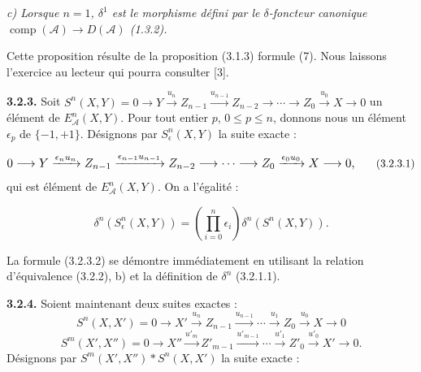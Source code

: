 \clearpage
{}%
\begingroup\small\setlength{\parskip}{0pt}\setlength{\emergencystretch}{1.5em}
\setlength{\abovedisplayskip}{4pt plus 2pt minus 2pt}%
\setlength{\belowdisplayskip}{4pt plus 2pt minus 2pt}%

\noindent\textit{c) Lorsque $n=1$, $\delta^1$ est le morphisme défini par
le $\delta$-foncteur canonique
$\operatorname{comp}(\mathcal A)\longrightarrow D(\mathcal A)$ (1.3.2).}

Cette proposition résulte de la proposition (3.1.3) formule (7). Nous
laissons l'exercice au lecteur qui pourra consulter [3].

\medskip\noindent\textbf{3.2.3.}\quad
Soit
$S^n(X,Y)=0\longrightarrow Y\xrightarrow{u_n}Z_{n-1}
\xrightarrow{u_{n-1}}Z_{n-2}\longrightarrow\cdots\longrightarrow Z_0
\xrightarrow{u_0}X\longrightarrow0$
un élément de $E_{\mathcal A}^{n}(X,Y)$. Pour tout entier $p$,
$0\leq p\leq n$, donnons nous un élément $\epsilon_p$ de $\{-1,+1\}$.
Désignons par $S_{\epsilon}^{n}(X,Y)$ la suite exacte :

\begin{equation}
\resizebox{0.94\textwidth}{!}{$\displaystyle
0\longrightarrow Y\xrightarrow{\epsilon_nu_n}Z_{n-1}
\xrightarrow{\epsilon_{n-1}u_{n-1}}Z_{n-2}\longrightarrow\cdots
\longrightarrow Z_0\xrightarrow{\epsilon_0u_0}X\longrightarrow0,
$}
\tag{3.2.3.1}
\end{equation}
qui est élément de $E_{\mathcal A}^{n}(X,Y)$. On a l'égalité :

\begin{equation}
\delta^n(S_{\epsilon}^{n}(X,Y))=
\left(\prod_{i=0}^{n}\epsilon_i\right)\delta^n(S^n(X,Y)).
\tag{3.2.3.2}
\end{equation}

La formule (3.2.3.2) se démontre immédiatement en utilisant la relation
d'équivalence (3.2.2), b) et la définition de $\delta^n$ (3.2.1.1).

\medskip\noindent\textbf{3.2.4.}\quad
Soient maintenant deux suites exactes :
\[
S^n(X,X')=0\longrightarrow X'\xrightarrow{u_n}Z_{n-1}
\xrightarrow{u_{n-1}}\cdots\xrightarrow{u_1}Z_0
\xrightarrow{u_0}X\longrightarrow0
\]
\[
S^m(X',X'')=0\longrightarrow X''\xrightarrow{u'_m}Z'_{m-1}
\xrightarrow{u'_{m-1}}\cdots\xrightarrow{u'_1}Z'_0
\xrightarrow{u'_0}X'\longrightarrow0.
\]
Désignons par $S^m(X',X'')*S^n(X,X')$ la suite exacte :


